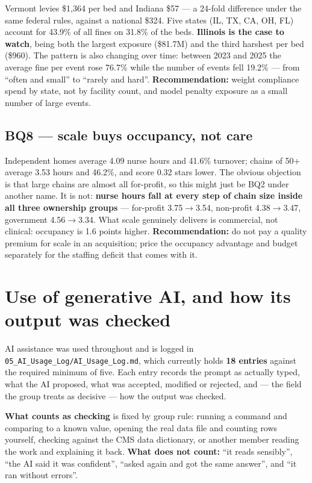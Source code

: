 \documentclass[11pt,a4paper]{article}
\newcommand{\code}[1]{\texttt{#1}}
\begin{document}
Vermont levies \$1{,}364 per bed and Indiana \$57 — a 24-fold difference under
the same federal rules, against a national \$324. Five states (IL, TX, CA, OH,
FL) account for 43.9\% of all fines on 31.8\% of the beds. \textbf{Illinois is
the case to watch}, being both the largest exposure (\$81.7M) and the third
harshest per bed (\$960). The pattern is also changing over time: between 2023
and 2025 the average fine per event rose 76.7\% while the number of events fell
19.2\% — from ``often and small'' to ``rarely and hard''.
\textbf{Recommendation:} weight compliance spend by state, not by facility
count, and model penalty exposure as a small number of large events.

\subsection{BQ8 — scale buys occupancy, not care}

Independent homes average 4.09 nurse hours and 41.6\% turnover; chains of 50+
average 3.53 hours and 46.2\%, and score 0.32 stars lower. The obvious objection
is that large chains are almost all for-profit, so this might just be BQ2 under
another name. It is not: \textbf{nurse hours fall at every step of chain size
inside all three ownership groups} — for-profit 3.75$\to$3.54, non-profit
4.38$\to$3.47, government 4.56$\to$3.34. What scale genuinely delivers is
commercial, not clinical: occupancy is 1.6 points higher.
\textbf{Recommendation:} do not pay a quality premium for scale in an
acquisition; price the occupancy advantage and budget separately for the
staffing deficit that comes with it.

\section{Use of generative AI, and how its output was checked}

AI assistance was used throughout and is logged in
\code{05\_AI\_Usage\_Log/AI\_Usage\_Log.md}, which currently holds
\textbf{18 entries} against the required minimum of five. Each entry records the
prompt as actually typed, what the AI proposed, what was accepted, modified or
rejected, and — the field the group treats as decisive — how the output was
checked.

\textbf{What counts as checking} is fixed by group rule: running a command and
comparing to a known value, opening the real data file and counting rows
yourself, checking against the CMS data dictionary, or another member reading
the work and explaining it back. \textbf{What does not count:} ``it reads
sensibly'', ``the AI said it was confident'', ``asked again and got the same
answer'', and ``it ran without errors''.
\end{document}
